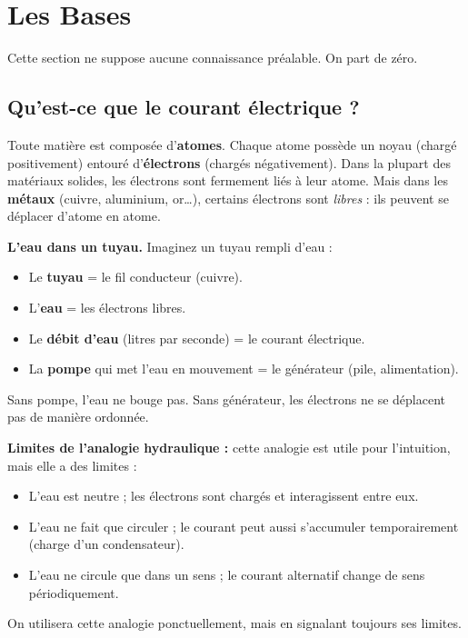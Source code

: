 \documentclass[12pt,a4paper,twoside]{book}
\begin{document}
\vspace{0.5cm}

\section{Les Bases}

\begin{bases}
Cette section ne suppose aucune connaissance préalable. On part de zéro.
\end{bases}

\subsection{Qu'est-ce que le courant électrique ?}

Toute matière est composée d'\textbf{atomes}. Chaque atome possède un noyau (chargé positivement) entouré d'\textbf{électrons} (chargés négativement). Dans la plupart des matériaux solides, les électrons sont fermement liés à leur atome. Mais dans les \textbf{métaux} (cuivre, aluminium, or\ldots), certains électrons sont \textit{libres} : ils peuvent se déplacer d'atome en atome.

\begin{analogie}
\textbf{L'eau dans un tuyau.} Imaginez un tuyau rempli d'eau :
\begin{itemize}[nosep]
\item Le \textbf{tuyau} = le fil conducteur (cuivre).
\item L'\textbf{eau} = les électrons libres.
\item Le \textbf{débit d'eau} (litres par seconde) = le courant électrique.
\item La \textbf{pompe} qui met l'eau en mouvement = le générateur (pile, alimentation).
\end{itemize}
Sans pompe, l'eau ne bouge pas. Sans générateur, les électrons ne se déplacent pas de manière ordonnée.
\end{analogie}

\begin{attention}
\textbf{Limites de l'analogie hydraulique :} cette analogie est utile pour l'intuition, mais elle a des limites :
\begin{itemize}[nosep]
\item L'eau est neutre ; les électrons sont chargés et interagissent entre eux.
\item L'eau ne fait que circuler ; le courant peut aussi s'accumuler temporairement (charge d'un condensateur).
\item L'eau ne circule que dans un sens ; le courant alternatif change de sens périodiquement.
\end{itemize}
On utilisera cette analogie ponctuellement, mais en signalant toujours ses limites.
\end{attention}
\end{document}
